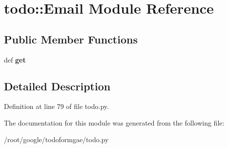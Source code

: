 \hypertarget{moduletodo_1_1_email}{
\section{todo::Email Module Reference}
\label{moduletodo_1_1_email}
}
\subsection*{Public Member Functions}
\begin{DoxyCompactItemize}
\item 
\hypertarget{moduletodo_1_1_email_acb1a8c381c22d0cc2f97952a4ef1da52}{
def {\bfseries get}}
\label{moduletodo_1_1_email_acb1a8c381c22d0cc2f97952a4ef1da52}

\end{DoxyCompactItemize}


\subsection{Detailed Description}


Definition at line 79 of file todo.py.

The documentation for this module was generated from the following file:\begin{DoxyCompactItemize}
\item 
/root/google/todoformgae/todo.py\end{DoxyCompactItemize}
